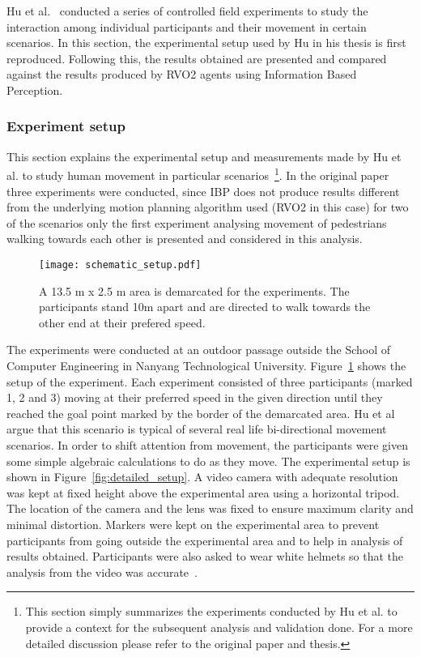 Hu et al.~\cite{hunanpaper,hunanThesis} conducted a series of controlled field experiments to study the interaction among individual participants and their movement in certain scenarios. In this section, the experimental setup used by Hu in his thesis is first reproduced. Following this, the results obtained are presented and compared against the results produced by RVO2 agents using Information Based Perception.

\subsubsection{Experiment setup} %
\label{sec:experiment_setup}

This section explains the experimental setup and measurements made by Hu et al. to study human movement in particular scenarios~\footnote{This section simply summarizes the experiments conducted by Hu et al. to provide a context for the subsequent analysis and validation done. For a more detailed discussion please refer to the original paper and thesis.}. In the original paper three experiments were conducted, since IBP does not produce results different from the underlying motion planning algorithm used (RVO2 in this case) for two of the scenarios only the first experiment analysing movement of pedestrians walking towards each other is presented and considered in this analysis.

\begin{figure}[!tbhp]
    \begin{center}
        \texttt{[image: schematic\_setup.pdf]}
    \end{center}
    \caption{A 13.5 m x 2.5 m area is demarcated for the experiments. The participants stand 10m apart and are directed to walk towards the other end at their prefered speed.}
    \label{fig:schematic_setup}
\end{figure}


The experiments were conducted at an outdoor passage outside the School of Computer Engineering in Nanyang Technological University. Figure~\ref{fig:schematic_setup} shows the setup of the experiment. Each experiment consisted of three participants (marked 1, 2 and 3) moving at their preferred speed in the given direction until they reached the goal point marked by the border of the demarcated area. Hu et al argue that this scenario is typical of several real life bi-directional movement scenarios. In order to shift attention from movement, the participants were given some simple algebraic calculations to do as they move.  The experimental setup is shown in Figure~\ref{fig:detailed_setup}. A video camera with adequate resolution was kept at fixed height above the experimental area using a horizontal tripod. The location of the camera and the lens was fixed to ensure maximum clarity and minimal distortion. Markers were kept on the experimental area to prevent participants from going outside the experimental area and to help in analysis of results obtained. Participants were also asked to wear white helmets so that the analysis from the video was accurate~\cite{W:2004tp}.


